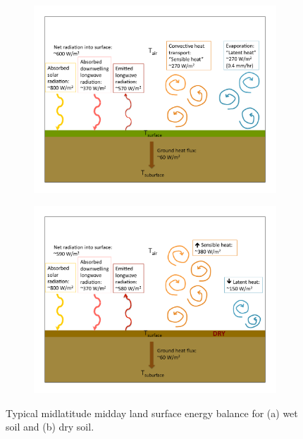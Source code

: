 \begin{figure}
\begin{subfigure}{0.75\textwidth}
\includegraphics[width=\textwidth]{ch0-introduction/energy_balance_wet.pdf}
\caption{}
\end{subfigure}
\begin{subfigure}{0.75\textwidth}
\includegraphics[width=\textwidth]{ch0-introduction/energy_balance_dry.pdf}
\caption{}
\end{subfigure}
\caption{Typical midlatitude midday land surface energy balance for (a) wet soil and (b) dry soil.}
\label{fig:intro_enbal}
\end{figure}

